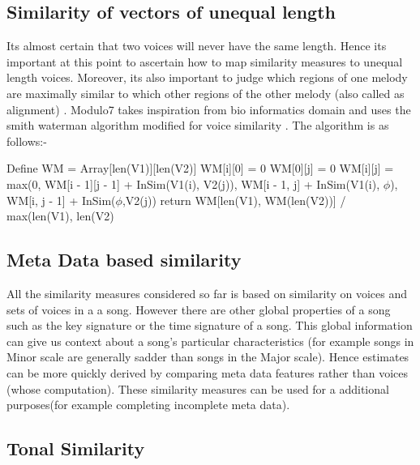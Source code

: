 \subsection{Similarity of vectors of unequal length} \label{sim:unequal}

\noindent Its almost certain that two voices will never have the same length. Hence its important at this point to ascertain how to map similarity measures to unequal length voices. Moreover, its also important to judge which regions of one melody are maximally similar to which other regions of the other melody (also called as alignment) . Modulo7 takes inspiration from bio informatics domain and uses the smith waterman algorithm modified for voice similarity \cite{smithWatermanBook}. The algorithm is as follows:-

\begin{algorithm}

\label{CHalgorithm}
\begin{algorithmic}[1]
 {}
\State Define WM = Array[len(V1)][len(V2)]
\State WM[i][0] = 0
\EndFor
{}
\State WM[0][j] = 0
\EndFor
{}
\State WM[i][j] = max(0, WM[i - 1][j - 1] + InSim(V1(i), V2(j)), WM[i - 1, j] + InSim(V1(i), $\phi$), WM[i, j - 1] + InSim($\phi$,V2(j))
\EndFor
\EndFor
\State return WM[len(V1), WM(len(V2))] / max(len(V1), len(V2)
\EndProcedure
\end{algorithmic}
\end{algorithm}

\subsection{Meta Data based similarity}

\noindent All the similarity measures considered so far is based on similarity on voices and sets of voices in a a song. However there are other global properties of a song such as the key signature or the time signature of a song. This global information can give us context about a song's particular characteristics (for example songs in Minor scale are generally sadder than songs in the Major scale). Hence estimates can be more quickly derived by comparing meta data features rather than voices (whose computation). These similarity measures can be used for a additional purposes(for example completing incomplete meta data). 

\subsection{Tonal Similarity}

